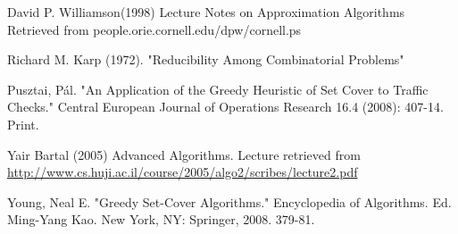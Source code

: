 \maketitle




\printbibliography

David P. Williamson(1998) Lecture Notes on Approximation Algorithms Retrieved from people.orie.cornell.edu/dpw/cornell.ps\vspace{\itemsep}

Richard M. Karp (1972). "Reducibility Among Combinatorial Problems"\vspace{\itemsep}

Pusztai, Pál. "An Application of the Greedy Heuristic of Set Cover to Traffic Checks." Central European Journal of Operations Research 16.4 (2008): 407-14. Print.\vspace{\itemsep}

Yair Bartal (2005) Advanced Algorithms. Lecture retrieved from \url{http://www.cs.huji.ac.il/course/2005/algo2/scribes/lecture2.pdf}\vspace{\itemsep}

Young, Neal E. "Greedy Set-Cover Algorithms." Encyclopedia of Algorithms. Ed. Ming-Yang Kao. New York, NY: Springer, 2008. 379-81.
